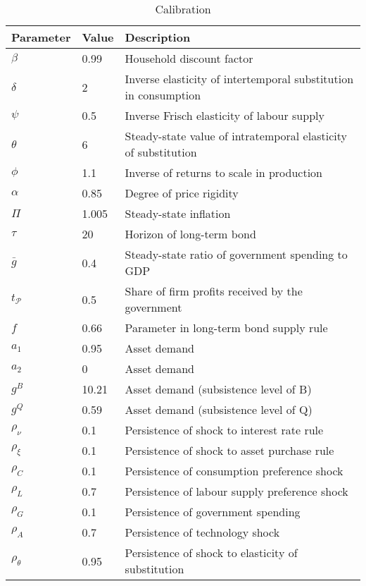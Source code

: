 \documentclass[12pt]{article}
\begin{document}
\begin{table}[t]
    \small
    \centering
    \caption{Calibration}
    \label{tb:cal}
    \begin{tabular}{lll}
        \hline Parameter & Value & Description \\ \hline\hline
        $\beta$ & 0.99 & Household discount factor \\
        $\delta$ & 2 & Inverse elasticity of intertemporal substitution in consumption \\
        $\psi$ & 0.5 & Inverse Frisch elasticity of labour supply \\
        $\theta$ & 6 & Steady-state value of intratemporal elasticity of substitution \\
        $\phi$ & 1.1 & Inverse of returns to scale in production \\
        $\alpha$ & 0.85 & Degree of price rigidity \\
        $\Pi$ & 1.005 & Steady-state inflation \\
        $\tau$ & 20 & Horizon of long-term bond \\
        $\bar{g}$ & 0.4 & Steady-state ratio of government spending to GDP \\
        $t_{\mathcal{P}}$ & 0.5 & Share of firm profits received by the government \\
        $f$ & 0.66 & Parameter in long-term bond supply rule \\
        $a_1$ & 0.95 & Asset demand \\
        $a_2$ & 0 & Asset demand \\
        $g^B$ & 10.21 & Asset demand (subsistence level of B) \\
        $g^Q$ & 0.59 & Asset demand (subsistence level of Q) \\
        $\rho_\nu$ & 0.1 & Persistence of shock to interest rate rule \\
        $\rho_{\xi}$ & 0.1 & Persistence of shock to asset purchase rule \\
        $\rho_C$ & 0.1 & Persistence of consumption preference shock \\
        $\rho_L$ & 0.7 & Persistence of labour supply preference shock \\
        $\rho_G$ & 0.1 & Persistence of government spending \\
        $\rho_A$ & 0.7 & Persistence of technology shock \\
        $\rho_\theta$ & 0.95 & Persistence of shock to elasticity of substitution \\

\end{tabular}
\end{table}
\end{document}
